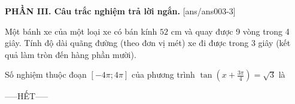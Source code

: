 \documentclass[12pt,a4paper]{article}
\begin{document}
{\bf PHẦN III. Câu trắc nghiệm trả lời ngắn.}
\setcounter{ex}{0}
[ans/ans003-3]
\begin{ex}
 Một bánh xe của một loại xe có bán kính ${52}$ cm và quay được 9 vòng trong 4 giây. Tính độ dài quãng đường (theo đơn vị mét) xe đi được trong 3 giây (kết quả làm tròn đến hàng phần mười). 

\end{ex}

\begin{ex}
 Số nghiệm thuộc đoạn $[- 4 \pi;4 \pi]$ của phương trình $\tan \left(x + \frac{3 \pi}{4}\right)=\sqrt{3}$ là

\end{ex}


 \begin{center}
-----HẾT-----
\end{center}

\newpage 
\end{document}
